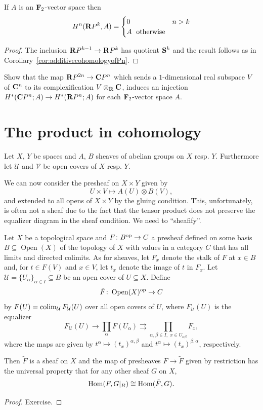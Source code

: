 \documentclass[a4paper,openany]{scrbook}
\DeclareMathOperator{\Open}{Open}
\begin{document}
\begin{corollary}\label{cor:additivecohomologyofRPn}
If $A$ is an $\F_2$-vector space then
\[
H^n(\R P^k,A) = \begin{cases} 0\; & n > k\\ A\; \text{ otherwise}\end{cases}
\]
\end{corollary}
\begin{proof}
The inclusion $\R P^{k-1} \to \R P^k$ has quotient $\S^k$ and the result follows as in Corollary~\ref{cor:additivecohomologyofPn}. 
\end{proof}

\begin{exer}\label{exer:complexificationincohomology}
Show that the map $\R P^{2n} \to \CP^n$ which sends a $1$-dimensional real subspace $V$ of $\CC^n$ to its complexification $V \otimes_\R \CC$, induces an injection $H^*(\CP^n;A) \to H^*(\R P^n;A)$ for each $\F_2$-vector space $A$.
\end{exer}

\section{The product in cohomology}

Let $X$, $Y$ be spaces and $A$, $B$ sheaves of abelian groups on $X$ resp. $Y$. Furthermore let $\mathcal U$ and $\mathcal V$ be open covers of $X$ resp. $Y$. 

We can now consider the presheaf on $X \times Y$ given by
\[
U \times V \mapsto A(U) \otimes B(V),
\]
and extended to all opens of $X \times Y$ by the gluing condition. This, unfortunately, is often not a sheaf due to the fact that the tensor product does not preserve the equalizer diagram in the sheaf condition. We need to “sheafify”.

\begin{prop}
Let $X$ be a topological space and $F\colon B^\op \to C$ a presheaf defined on some basis $B \subseteq \Open(X)$ of the topology of $X$ with values in a category $C$ that has all limits and directed colimits. As for sheaves, let $F_x$ denote the stalk of $F$ at $x \in B$ and, for $t \in F(V)$ and $x \in V$, let $t_x$ denote the image of $t$ in $F_x$. Let $\mathcal U = \{U_\alpha\}_{\alpha \in I} \subseteq B$ be an open cover of $U \subseteq X$. Define
\[
\tilde F\colon \Open(X)^\op \to C
\]
by $F(U) = \colim_{\mathcal U} F_{\mathcal U}(U)$ over all open covers of $U$, where $F_{\mathcal U}(U)$ is the equalizer
\[
F_{\mathcal U}(U) \to \prod_{\alpha} F(U_\alpha) \rightrightarrows \prod_{\alpha,\beta \in I,\; x \in U_{\alpha\beta}} F_x,
\]
where the maps are given by $t^\alpha \mapsto (t_x)^{\alpha,\beta}$ and $t^\alpha \mapsto (t_x)^{\beta,\alpha}$, respectively.

Then $\tilde F$ is a sheaf on $X$ and the map of presheaves $F \to \tilde F$ given by restriction has the universal property that for any other sheaf $G$ on $X$,
\[
\Hom(F,G|_B) \cong \Hom(\tilde F,G).
\]
\end{prop}
\begin{proof}
Exercise.
\end{proof}
\end{document}
